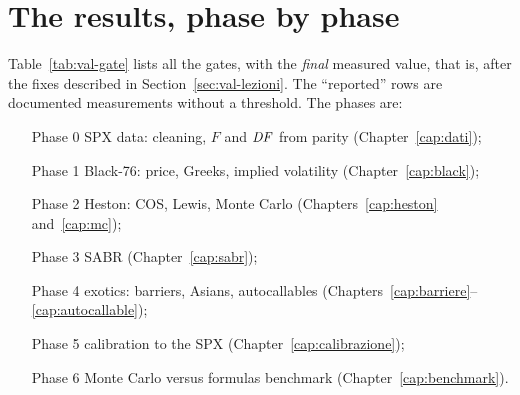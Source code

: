 \section{The results, phase by phase}
Table~\ref{tab:val-gate} lists all the gates, with the \emph{final} measured value, that is, after the fixes described
in Section~\ref{sec:val-lezioni}. The ``reported'' rows are documented measurements without a threshold. The phases
are:
\begin{itemize}[leftmargin=4.2em,labelwidth=3.4em,labelsep=0.8em,align=left]
\item[Phase 0] SPX data: cleaning, $F$ and $\mathit{DF}$ from parity (Chapter~\ref{cap:dati});
\item[Phase 1] Black-76: price, Greeks, implied volatility (Chapter~\ref{cap:black});
\item[Phase 2] Heston: COS, Lewis, Monte Carlo (Chapters~\ref{cap:heston} and~\ref{cap:mc});
\item[Phase 3] SABR (Chapter~\ref{cap:sabr});
\item[Phase 4] exotics: barriers, Asians, autocallables (Chapters~\ref{cap:barriere}--\ref{cap:autocallable});
\item[Phase 5] calibration to the SPX (Chapter~\ref{cap:calibrazione});
\item[Phase 6] Monte Carlo versus formulas benchmark (Chapter~\ref{cap:benchmark}).
\end{itemize}

